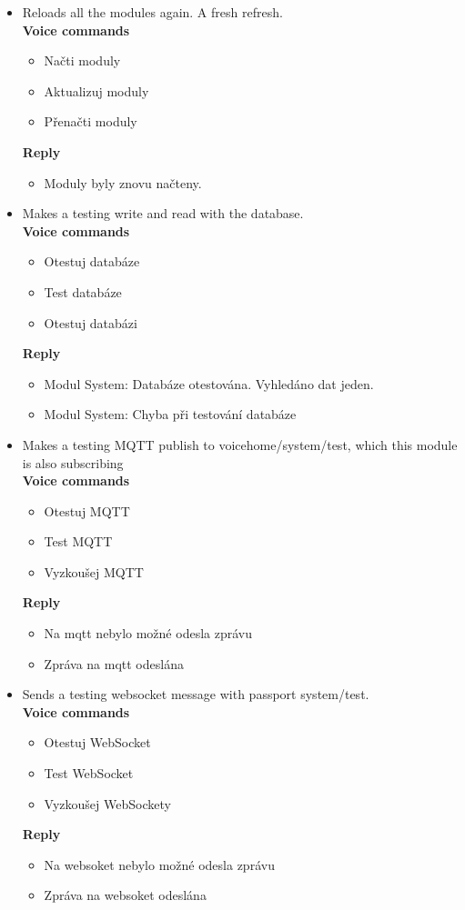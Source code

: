 \begin{itemize}
    \item Reloads all the modules again. A fresh refresh.\\
    \textbf{Voice commands}
    \begin{itemize}
        \item Načti moduly
        \item Aktualizuj moduly
        \item Přenačti moduly
    \end{itemize}
    \textbf{Reply}
    \begin{itemize}
        \item Moduly byly znovu načteny.
    \end{itemize}
    \item Makes a testing write and read with the database.\\
    \textbf{Voice commands}
    \begin{itemize}
        \item Otestuj databáze
        \item Test databáze
        \item Otestuj databázi
    \end{itemize}
    \textbf{Reply}
    \begin{itemize}
        \item Modul System: Databáze otestována. Vyhledáno dat jeden.
        \item Modul System: Chyba při testování databáze
    \end{itemize}
    \item Makes a testing MQTT publish to voicehome/system/test, which this module is also subscribing\\
    \textbf{Voice commands}
    \begin{itemize}
        \item Otestuj MQTT
        \item Test MQTT
        \item Vyzkoušej MQTT
    \end{itemize}
    \textbf{Reply}
    \begin{itemize}
        \item Na mqtt nebylo možné odesla zprávu
        \item Zpráva na mqtt odeslána
    \end{itemize}
    \item Sends a testing websocket message with passport system/test.\\
    \textbf{Voice commands}
    \begin{itemize}
        \item Otestuj WebSocket
        \item Test WebSocket
        \item Vyzkoušej WebSockety
    \end{itemize}
    \textbf{Reply}
    \begin{itemize}
        \item Na websoket nebylo možné odesla zprávu
        \item Zpráva na websoket odeslána
    \end{itemize}
\end{itemize}

